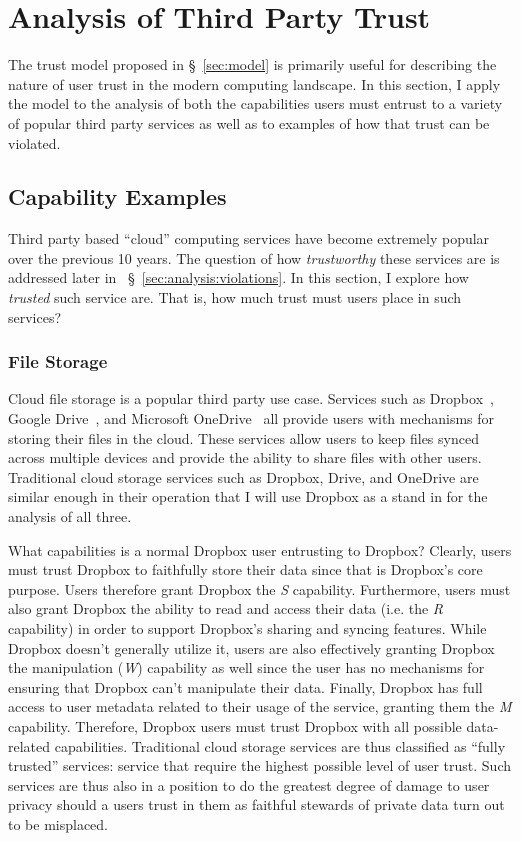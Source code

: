 \section{Analysis of Third Party Trust}
\label{sec:analysis}

The trust model proposed in \S~\ref{sec:model} is primarily useful for
describing the nature of user trust in the modern computing
landscape. In this section, I apply the model to the analysis of both
the capabilities users must entrust to a variety of popular third
party services as well as to examples of how that trust can be
violated.

\subsection{Capability Examples}
\label{sec:analysis:capabilites}

Third party based ``cloud'' computing services have become extremely
popular over the previous 10 years.  The question of how
\textit{trustworthy} these services are is addressed later in
~\S~\ref{sec:analysis:violations}. In this section, I explore how
\textit{trusted} such service are. That is, how much trust must users
place in such services?

\subsubsection{File Storage}

Cloud file storage is a popular third party use case. Services such as
Dropbox~\cite{dropbox}, Google Drive~\cite{google-drive}, and
Microsoft OneDrive~\cite{microsoft-onedrive} all provide users with
mechanisms for storing their files in the cloud. These services allow
users to keep files synced across multiple devices and provide the
ability to share files with other users. Traditional cloud storage
services such as Dropbox, Drive, and OneDrive are similar enough in
their operation that I will use Dropbox as a stand in for the analysis
of all three.

What capabilities is a normal Dropbox user entrusting to Dropbox?
Clearly, users must trust Dropbox to faithfully store their data since
that is Dropbox's core purpose. Users therefore grant Dropbox the
\emph{S} capability. Furthermore, users must also grant Dropbox the
ability to read and access their data (i.e. the \emph{R} capability)
in order to support Dropbox's sharing and syncing features. While
Dropbox doesn't generally utilize it, users are also effectively
granting Dropbox the manipulation (\emph{W}) capability as well since
the user has no mechanisms for ensuring that Dropbox can't manipulate
their data. Finally, Dropbox has full access to user metadata related
to their usage of the service, granting them the \emph{M}
capability. Therefore, Dropbox users must trust Dropbox with all
possible data-related capabilities. Traditional cloud storage services
are thus classified as ``fully trusted'' services: service that
require the highest possible level of user trust. Such services are
thus also in a position to do the greatest degree of damage to user
privacy should a users trust in them as faithful stewards of private
data turn out to be misplaced.

